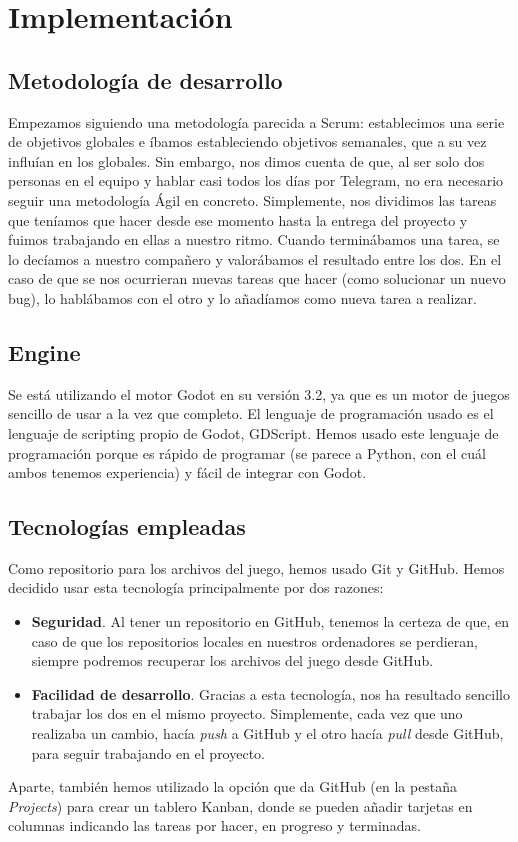 \chapter{Implementación}
\section{Metodología de desarrollo}
Empezamos siguiendo una metodología parecida a Scrum: establecimos una serie de objetivos globales e íbamos estableciendo objetivos semanales, que a su vez influían en los globales. Sin embargo, nos dimos cuenta de que, al ser solo dos personas en el equipo y hablar casi todos los días por Telegram, no era necesario seguir una metodología Ágil en concreto. Simplemente, nos dividimos las tareas que teníamos que hacer desde ese momento hasta la entrega del proyecto y fuimos trabajando en ellas a nuestro ritmo. Cuando terminábamos una tarea, se lo decíamos a nuestro compañero y valorábamos el resultado entre los dos. En el caso de que se nos ocurrieran nuevas tareas que hacer (como solucionar un nuevo bug), lo hablábamos con el otro y lo añadíamos como nueva tarea a realizar.

\section{Engine}

Se está utilizando el motor Godot en su versión 3.2, ya que es un motor de juegos sencillo de usar a la vez que completo. El lenguaje de programación usado es el lenguaje de scripting propio de Godot, GDScript. Hemos usado este lenguaje de programación porque es rápido de programar (se parece a Python, con el cuál ambos tenemos experiencia) y fácil de integrar con Godot.
	
\section{Tecnologías empleadas}
Como repositorio para los archivos del juego, hemos usado Git y GitHub. Hemos decidido usar esta tecnología principalmente por dos razones:

\begin{itemize}
	\item \textbf{Seguridad}. Al tener un repositorio en GitHub, tenemos la certeza de que, en caso de que los repositorios locales en nuestros ordenadores se perdieran, siempre podremos recuperar los archivos del juego desde GitHub.
	\item \textbf{Facilidad de desarrollo}. Gracias a esta tecnología, nos ha resultado sencillo trabajar los dos en el mismo proyecto. Simplemente, cada vez que uno realizaba un cambio, hacía \emph{push} a GitHub y el otro hacía \emph{pull} desde GitHub, para seguir trabajando en el proyecto.
\end{itemize}

Aparte, también hemos utilizado la opción que da GitHub (en la pestaña \emph{Projects}) para crear un tablero Kanban, donde se pueden añadir tarjetas en columnas indicando las tareas por hacer, en progreso y terminadas.